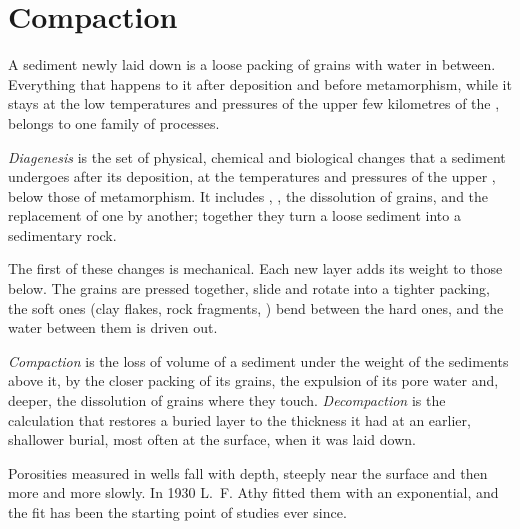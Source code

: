 \section{Compaction}\label{sec:b1:diagenesis-basins:compaction}

A sediment newly laid down is a loose packing of grains with water in between.
Everything that happens to it after deposition and before metamorphism, while it
stays at the low temperatures and pressures of the upper few kilometres of the
, belongs to one family of processes.

\begin{definition}[Diagenesis]\label{def:b1:diagenesis-basins:diagenesis}
\emph{Diagenesis} is the set of physical, chemical and
biological changes that a sediment undergoes after its deposition, at the
temperatures and pressures of the upper , below those of metamorphism. It
includes , , the dissolution of grains, and the
replacement of one  by another; together they turn a loose sediment into
a sedimentary rock.
\end{definition}

The first of these changes is mechanical. Each new layer adds its weight to
those below. The grains are pressed together, slide and rotate into a tighter
packing, the soft ones (clay flakes, rock fragments, ) bend between the hard
ones, and the water between them is driven out.

\begin{definition}\label{def:b1:diagenesis-basins:compaction}
\emph{Compaction} is the loss of volume of a sediment under
the weight of the sediments above it, by the closer packing of its grains, the
expulsion of its pore water and, deeper, the dissolution of grains where they
touch. \emph{Decompaction} is the calculation that restores
a buried layer to the thickness it had at an earlier, shallower burial, most
often at the surface, when it was laid down.
\end{definition}

Porosities measured in wells fall with depth, steeply near the surface and then
more and more slowly. In 1930 L.~F. Athy fitted them with an exponential, and
the fit has been the starting point of  studies ever since.

